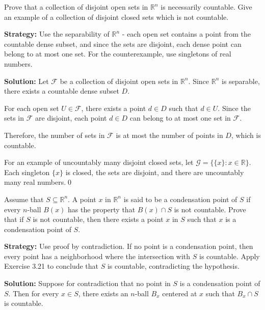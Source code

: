 \begin{problembox}
Prove that a collection of disjoint open sets in \( \mathbb{R}^n \) is necessarily countable. Give an example of a collection of disjoint closed sets which is not countable.
\end{problembox}

\noindent\textbf{Strategy:} Use the separability of $\mathbb{R}^n$ - each open set contains a point from the countable dense subset, and since the sets are disjoint, each dense point can belong to at most one set. For the counterexample, use singletons of real numbers.

\bigskip\noindent\textbf{Solution:} Let $\mathcal{F}$ be a collection of disjoint open sets in $\mathbb{R}^n$. Since $\mathbb{R}^n$ is separable, there exists a countable dense subset $D$.

For each open set $U \in \mathcal{F}$, there exists a point $d \in D$ such that $d \in U$. Since the sets in $\mathcal{F}$ are disjoint, each point $d \in D$ can belong to at most one set in $\mathcal{F}$.

Therefore, the number of sets in $\mathcal{F}$ is at most the number of points in $D$, which is countable.

For an example of uncountably many disjoint closed sets, let $\mathcal{G} = \{\{x\} : x \in \mathbb{R}\}$. Each singleton $\{x\}$ is closed, the sets are disjoint, and there are uncountably many real numbers.\qed


\begin{problembox}
Assume that \( S \subseteq \mathbb{R}^n \). A point \( x \) in \( \mathbb{R}^n \) is said to be a condensation point of \( S \) if every \( n \)-ball \( B(x) \) has the property that \( B(x) \cap S \) is not countable. Prove that if \( S \) is not countable, then there exists a point \( x \) in \( S \) such that \( x \) is a condensation point of \( S \).
\end{problembox}

\noindent\textbf{Strategy:} Use proof by contradiction. If no point is a condensation point, then every point has a neighborhood where the intersection with $S$ is countable. Apply Exercise 3.21 to conclude that $S$ is countable, contradicting the hypothesis.

\bigskip\noindent\textbf{Solution:} Suppose for contradiction that no point in $S$ is a condensation point of $S$. Then for every $x \in S$, there exists an $n$-ball $B_x$ centered at $x$ such that $B_x \cap S$ is countable.

